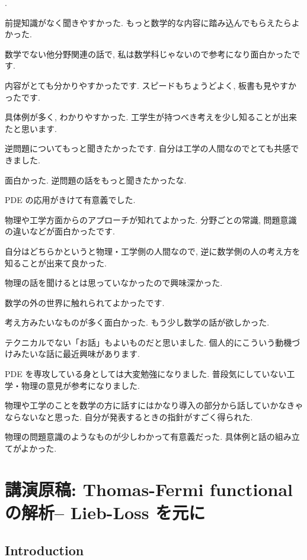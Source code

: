 \documentclass[openany, a4paper, oneside]{book}
\newcounter{enum2}
\renewenvironment{enumerate}{%
\begin{list}%
{%
\arabic{enum2}.\ \,%
}%
{%
\usecounter{enum2}
\setlength{\itemindent}{0pt}%
\setlength{\leftmargin}{6pt}%
\setlength{\rightmargin}{0pt}%
\setlength{\labelsep}{0pt}%
\setlength{\labelwidth}{6pt}%
\setlength{\itemsep}{0pt}%
\setlength{\parsep}{0pt}%
\setlength{\listparindent}{0pt}%
}
}{%
\end{list}%
}
\theoremstyle{break}
\theoremstyle{breakdefn}
\begin{document}
\begin{enumerate}
\item 前提知識がなく聞きやすかった.
   もっと数学的な内容に踏み込んでもらえたらよかった.
\item 数学でない他分野関連の話で, 私は数学科じゃないので参考になり面白かったです.
\item 内容がとても分かりやすかったです.
   スピードもちょうどよく, 板書も見やすかったです.
\item 具体例が多く, わかりやすかった.
   工学生が持つべき考えを少し知ることが出来たと思います.
\item 逆問題についてもっと聞きたかったです. 自分は工学の人間なのでとても共感できました.
\item 面白かった. 逆問題の話をもっと聞きたかったな.
\item PDE の応用がきけて有意義でした.
\item 物理や工学方面からのアプローチが知れてよかった.
   分野ごとの常識, 問題意識の違いなどが面白かったです.
\item 自分はどちらかというと物理・工学側の人間なので, 逆に数学側の人の考え方を知ることが出来て良かった.
\item 物理の話を聞けるとは思っていなかったので興味深かった.
\item 数学の外の世界に触れられてよかったです.
\item 考え方みたいなものが多く面白かった. もう少し数学の話が欲しかった.
\item テクニカルでない「お話」もよいものだと思いました. 個人的にこういう動機づけみたいな話に最近興味があります.
\item PDE を専攻している身としては大変勉強になりました.
    普段気にしていない工学・物理の意見が参考になりました.
\item 物理や工学のことを数学の方に話すにはかなり導入の部分から話していかなきゃならないなと思った.
    自分が発表するときの指針がすごく得られた.
\item 物理の問題意識のようなものが少しわかって有意義だった.
    具体例と話の組み立てがよかった.
\end{enumerate}
\chapter{講演原稿: Thomas-Fermi functional の解析-- Lieb-Loss \cite{LiebLoss1} を元に}
\label{sec-7-10}
\section{Introduction}
\label{sec-7-10-1}
\end{document}
